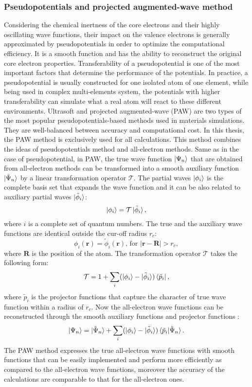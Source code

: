 \subsubsection{Pseudopotentials and projected augmented-wave method}
Considering the chemical inertness of the core electrons and their highly oscillating wave functions, their impact on the valence electrons is generally approximated by pseudopotentials in order to optimize the computational efficiency. It is a smooth function and has the ability to reconstruct the original core electron properties. Transferability of a pseudopotential is one of the most important factors that determine the performance of the potentials. In practice, a pseudopotential is usually constructed for one isolated atom of one element, while being used in complex multi-elements system, the potentials with higher transferability can simulate what a real atom will react to these different environments. Ultrasoft \cite{Ultrasoft1} and projected augmented-wave (PAW) \cite{PAW1,Kresse1999} are two types of the most popular pseudopotentials-based methods used in materials simulations. They are well-balanced between accuracy and computational cost. In this thesis, the PAW method is exclusively used for all calculations. This method combines the ideas of pseudopotentials method and all-electron methods. Same as in the case of pseudopotential, in PAW, the true wave function $\ket{\Psi_n}$ that are obtained from all-electron methods can be transformed into a smooth auxiliary function $\ket{\tilde{\Psi}_n}$ by a linear transformation operator $\mathcal{T}$. The partial waves $\ket{\phi_i}$ is the complete basis set that expands the wave function and it can be also related to auxiliary partial waves $\ket{\tilde{\phi}_i}$:
\begin{equation}
\ket{\phi_i}=\mathcal{T}\ket{\tilde{\phi}_i},
\end{equation}
where $i$ is a complete set of quantum numbers. The true and the auxiliary wave functions are identical outside the cur-off radius $r_c$:
\begin{equation}
\phi_i(\mathbf{r})=\tilde{\phi}_i(\mathbf{r})\text{, for }|\mathbf{r}-\mathbf{R}|>r_c,
\end{equation}
where $\mathbf{R}$ is the position of the atom. The transformation operator $\mathcal{T}$ takes the following form:
\begin{equation}
\mathcal{T}=1+\sum_i(\ket{\phi_i}-\ket{\tilde{\phi}_i})\bra{\tilde{p}_i},
\end{equation}
where $\tilde{p}_i$ is the projector functions that capture the character of true wave function within a radius of $r_c$. Now the all-electron wave functions can be reconstructed through the smooth auxiliary functions and projector functions :
\begin{equation}
\ket{\Psi_n}=\ket{\tilde{\Psi}_n}+\sum_i(\ket{\phi_i}-\ket{\tilde{\phi}_i})\braket{\tilde{p}_i|\tilde{\Psi}_n}.
\end{equation}
The PAW method expresses the true all-electron wave functions with smooth functions that can be easily implemented and perform more efficiently as compared to the all-electron wave functions, moreover the accuracy of the calculations are comparable to that for the all-electron ones.
